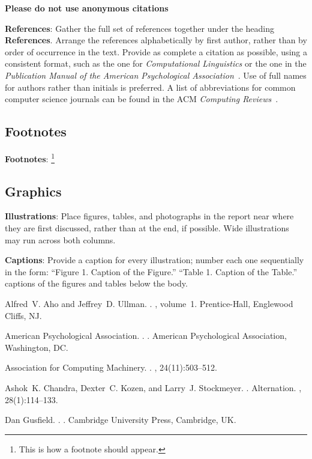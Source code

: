 \documentclass[11pt]{article}
\begin{document}
\textbf{Please do not use anonymous citations}

\textbf{References}: Gather the full set of references together under
the heading {\bf References}. Arrange the references alphabetically
by first author, rather than by order of occurrence in the text.
Provide as complete a citation as possible, using a consistent format,
such as the one for {\em Computational Linguistics\/} or the one in the
{\em Publication Manual of the American
Psychological Association\/}~\cite{APA:83}. Use of full names for
authors rather than initials is preferred.  A list of abbreviations
for common computer science journals can be found in the ACM
{\em Computing Reviews\/}~\cite{ACM:83}.

\subsection{Footnotes}

{\bf Footnotes}: \footnote{This is how a footnote should appear.}

\subsection{Graphics}

{\bf Illustrations}: Place figures, tables, and photographs in the
report near where they are first discussed, rather than at the end, if
possible.  Wide illustrations may run across both columns.

{\bf Captions}: Provide a caption for every illustration; number each one
sequentially in the form:  ``Figure 1. Caption of the Figure.'' ``Table 1.
Caption of the Table.''  captions of the figures and
tables below the body.

\begin{thebibliography}{}

Alfred~V. Aho and Jeffrey~D. Ullman.
.
, volume~1.
\newblock Prentice-{Hall}, Englewood Cliffs, NJ.

{American Psychological Association}.
.
.
\newblock American Psychological Association, Washington, DC.

{Association for Computing Machinery}.
.
, 24(11):503--512.

Ashok~K. Chandra, Dexter~C. Kozen, and Larry~J. Stockmeyer.
.
\newblock Alternation.
,
  28(1):114--133.

Dan Gusfield.
.
.
\newblock Cambridge University Press, Cambridge, UK.

\end{thebibliography}
\end{document}

